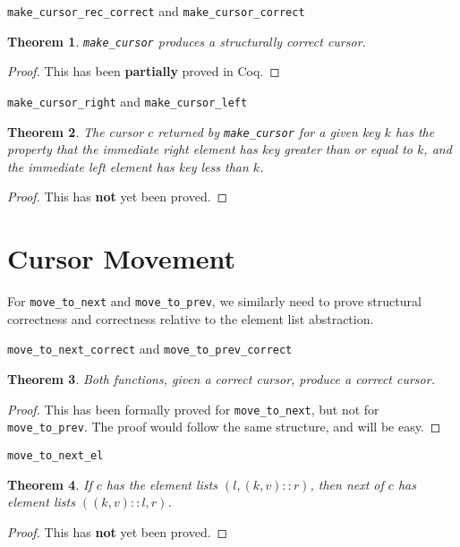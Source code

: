 \documentclass[12pt]{article}
\newtheorem{theorem}{Theorem}
\begin{document}
\bigskip
\texttt{make\_cursor\_rec\_correct} and \texttt{make\_cursor\_correct}

\begin{theorem}
\texttt{make\_cursor} produces a structurally correct cursor.
\end{theorem}

\begin{proof}
This has been \textbf{partially} proved in Coq.
\end{proof}

\bigskip
\texttt{make\_cursor\_right} and \texttt{make\_cursor\_left}

\begin{theorem}
The cursor $c$ returned by \texttt{make\_cursor} for a given key $k$ has the property that the immediate right element has key greater than or equal to $k$, and the immediate left element has key less than $k$.
\end{theorem}

\begin{proof}
This has \textbf{not} yet been proved.
\end{proof}

\section{Cursor Movement}

For \texttt{move\_to\_next} and \texttt{move\_to\_prev}, we similarly need to prove structural correctness and correctness relative to the element list abstraction.

\bigskip
\texttt{move\_to\_next\_correct} and \texttt{move\_to\_prev\_correct}

\begin{theorem}
Both functions, given a correct cursor, produce a correct cursor.
\end{theorem}

\begin{proof}
This has been formally proved for \texttt{move\_to\_next}, but not for \texttt{move\_to\_prev}. The proof would follow the same structure, and will be easy.
\end{proof}

\bigskip
\texttt{move\_to\_next\_el}

\begin{theorem}
If $c$ has the element lists $(l,(k,v)::r)$, then next of $c$ has element lists $((k,v)::l,r)$.
\end{theorem}

\begin{proof}
This has \textbf{not} yet been proved.
\end{proof}
\end{document}
